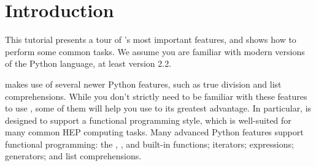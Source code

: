 \chapter{Introduction}

This tutorial presents a tour of \pyhep's most important features, and
shows how to perform some common tasks.  We assume you are familiar with
modern versions of the Python language, at least version 2.2.  

\pyhep makes use of several newer Python features, such as true division
and list comprehensions.  While you don't strictly need to be familiar
with these features to use \pyhep, some of them will help you use \pyhep
to its greatest advantage.  In particular, \pyhep is designed to support
a functional programming style, which is well-suited for many common HEP
computing tasks.  Many advanced Python features support functional
programming: the , , and
 built-in functions; iterators; 
expressions; generators; and list comprehensions.

